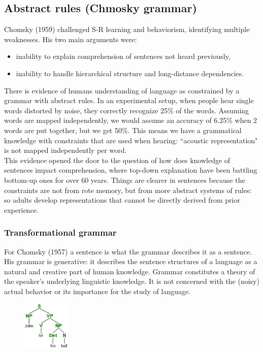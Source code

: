 \subsection{Abstract rules (Chmosky grammar)}
Chomsky (1959) challenged S-R learning and behaviorism, identifying multiple weaknesses. His two main arguments were:
\begin{itemize}
    \item inability to explain comprehension of sentences not heard previously,
    \item inability to handle hierarchical structure and long-distance dependencies.
\end{itemize}

There is evidence of humans understanding of language as constrained by a grammar with abstract rules.
In an experimental setup, when people hear single words distorted by noise, they correctly recognize 25\% of the words. Assuming words are mapped independently, we would assume an accuracy of 6.25\% when 2 words are put together, but we get 50\%. This means we have a grammatical knowledge with constraints that are used when hearing: ``acoustic representation" is not mapped independently per word.\\

This evidence opened the door to the question of how does knowledge of sentences impact comprehension, where top-down explanation have been battling bottom-up ones for over 60 years.
Things are clearer in sentences because the constraints are not from rote memory, but from more abstract systems of rules: so adults develop representations that cannot be directly derived from prior experience.

\subsubsection{Transformational grammar}
For Chomsky (1957) a sentence is what the grammar describes it as a sentence.
His grammar is generative: it describes the sentence structures of a language as a natural and creative part of human knowledge.
Grammar constitutes a theory of the speaker’s underlying linguistic 
knowledge. It is not concerned with the (noisy) actual behavior or its importance for the study of language.\\

\begin{figure}
  \centering
  \includegraphics[width=0.2\textwidth]{images/tree.png}
  \caption{}
  \label{fig:tree}
\end{figure}

